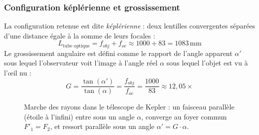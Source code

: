 \documentclass[12pt,a4paper]{report}
\begin{document}
\subsubsection{Configuration képlérienne et grossissement}
La configuration retenue est dite \textit{képlérienne} : deux lentilles convergentes séparées d'une distance égale à la somme de leurs focales :
\begin{equation}
    L_{\text{tube optique}} = f_{obj} + f_{oc} \approx 1000 + 83 = 1083\,\text{mm}
\end{equation}
Le grossissement angulaire est défini comme le rapport de l'angle apparent $\alpha'$ sous lequel l'observateur voit l'image à l'angle réel $\alpha$ sous lequel l'objet est vu à l'œil nu :
\begin{equation}
    G = \frac{\tan(\alpha')}{\tan(\alpha)} = \frac{f_{obj}}{f_{oc}} = \frac{1000}{83} \approx 12{,}05\times
\end{equation}

\begin{figure}[H]
    \centering
    \caption{Marche des rayons dans le télescope de Kepler : un faisceau parallèle (étoile à l'infini) entre sous un angle $\alpha$, converge au foyer commun $F'_1=F_2$, et ressort parallèle sous un angle $\alpha' = G \cdot \alpha$.}
    \label{fig:kepler}
\end{figure}
\end{document}
